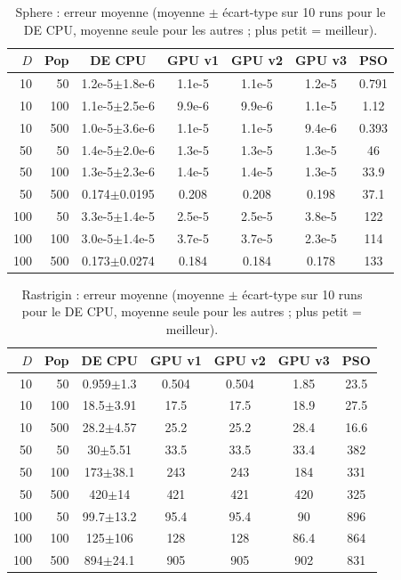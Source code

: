 \begin{table}[!t]\centering\scriptsize\setlength{\tabcolsep}{2pt}\caption{Sphere : erreur moyenne (moyenne $\pm$ \'ecart-type sur 10 runs pour le DE CPU, moyenne seule pour les autres ; plus petit = meilleur).}\label{tab:sphere}
\begin{tabular}{rr|ccccc}\toprule $D$ & Pop & DE CPU & GPU v1 & GPU v2 & GPU v3 & PSO\\\midrule
10 & 50 & 1.2e-5$\pm$1.8e-6 & 1.1e-5 & 1.1e-5 & 1.2e-5 & 0.791\\
10 & 100 & 1.1e-5$\pm$2.5e-6 & 9.9e-6 & 9.9e-6 & 1.1e-5 & 1.12\\
10 & 500 & 1.0e-5$\pm$3.6e-6 & 1.1e-5 & 1.1e-5 & 9.4e-6 & 0.393\\
\midrule
50 & 50 & 1.4e-5$\pm$2.0e-6 & 1.3e-5 & 1.3e-5 & 1.3e-5 & 46\\
50 & 100 & 1.3e-5$\pm$2.3e-6 & 1.4e-5 & 1.4e-5 & 1.3e-5 & 33.9\\
50 & 500 & 0.174$\pm$0.0195 & 0.208 & 0.208 & 0.198 & 37.1\\
\midrule
100 & 50 & 3.3e-5$\pm$1.4e-5 & 2.5e-5 & 2.5e-5 & 3.8e-5 & 122\\
100 & 100 & 3.0e-5$\pm$1.4e-5 & 3.7e-5 & 3.7e-5 & 2.3e-5 & 114\\
100 & 500 & 0.173$\pm$0.0274 & 0.184 & 0.184 & 0.178 & 133\\
\bottomrule\end{tabular}\end{table}
\begin{table}[!t]\centering\scriptsize\setlength{\tabcolsep}{2pt}\caption{Rastrigin : erreur moyenne (moyenne $\pm$ \'ecart-type sur 10 runs pour le DE CPU, moyenne seule pour les autres ; plus petit = meilleur).}\label{tab:rastrigin}
\begin{tabular}{rr|ccccc}\toprule $D$ & Pop & DE CPU & GPU v1 & GPU v2 & GPU v3 & PSO\\\midrule
10 & 50 & 0.959$\pm$1.3 & 0.504 & 0.504 & 1.85 & 23.5\\
10 & 100 & 18.5$\pm$3.91 & 17.5 & 17.5 & 18.9 & 27.5\\
10 & 500 & 28.2$\pm$4.57 & 25.2 & 25.2 & 28.4 & 16.6\\
\midrule
50 & 50 & 30$\pm$5.51 & 33.5 & 33.5 & 33.4 & 382\\
50 & 100 & 173$\pm$38.1 & 243 & 243 & 184 & 331\\
50 & 500 & 420$\pm$14 & 421 & 421 & 420 & 325\\
\midrule
100 & 50 & 99.7$\pm$13.2 & 95.4 & 95.4 & 90 & 896\\
100 & 100 & 125$\pm$106 & 128 & 128 & 86.4 & 864\\
100 & 500 & 894$\pm$24.1 & 905 & 905 & 902 & 831\\
\bottomrule\end{tabular}\end{table}
